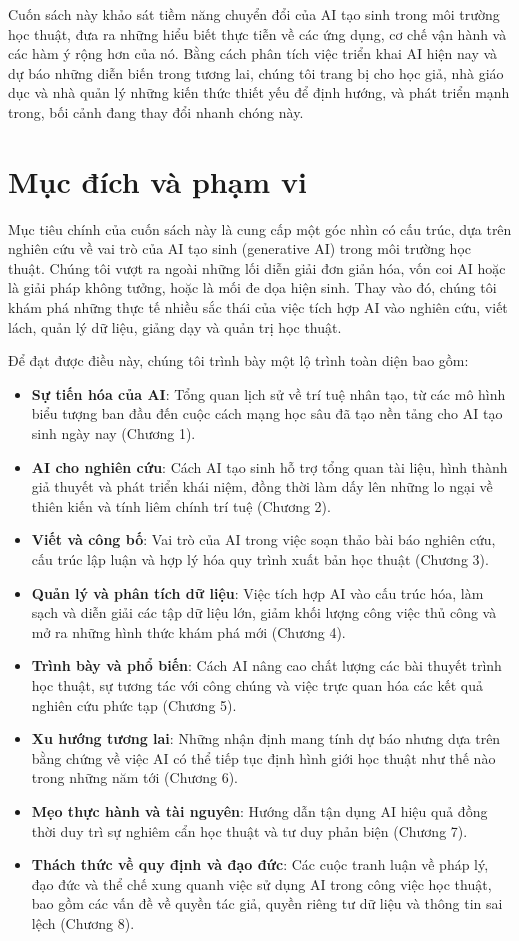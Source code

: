 Cuốn sách này khảo sát tiềm năng chuyển đổi của AI tạo sinh trong môi trường học thuật, đưa ra những hiểu biết thực tiễn về các ứng dụng, cơ chế vận hành và các hàm ý rộng hơn của nó. Bằng cách phân tích việc triển khai AI hiện nay và dự báo những diễn biến trong tương lai, chúng tôi trang bị cho học giả, nhà giáo dục và nhà quản lý những kiến thức thiết yếu để định hướng, và phát triển mạnh trong, bối cảnh đang thay đổi nhanh chóng này.

\section{Mục đích và phạm vi}

Mục tiêu chính của cuốn sách này là cung cấp một góc nhìn có cấu trúc, dựa trên nghiên cứu về vai trò của AI tạo sinh (generative AI) trong môi trường học thuật. Chúng tôi vượt ra ngoài những lối diễn giải đơn giản hóa, vốn coi AI hoặc là giải pháp không tưởng, hoặc là mối đe dọa hiện sinh. Thay vào đó, chúng tôi khám phá những thực tế nhiều sắc thái của việc tích hợp AI vào nghiên cứu, viết lách, quản lý dữ liệu, giảng dạy và quản trị học thuật.

Để đạt được điều này, chúng tôi trình bày một lộ trình toàn diện bao gồm:

\begin{itemize}
\item
  \textbf{Sự tiến hóa của AI}: Tổng quan lịch sử về trí tuệ nhân tạo, từ các mô hình biểu tượng ban đầu đến cuộc cách mạng học sâu đã tạo nền tảng cho AI tạo sinh ngày nay (Chương 1).
\item
  \textbf{AI cho nghiên cứu}: Cách AI tạo sinh hỗ trợ tổng quan tài liệu, hình thành giả thuyết và phát triển khái niệm, đồng thời làm dấy lên những lo ngại về thiên kiến và tính liêm chính trí tuệ (Chương 2).
\item
  \textbf{Viết và công bố}: Vai trò của AI trong việc soạn thảo bài báo nghiên cứu, cấu trúc lập luận và hợp lý hóa quy trình xuất bản học thuật (Chương 3).
\item
  \textbf{Quản lý và phân tích dữ liệu}: Việc tích hợp AI vào cấu trúc hóa, làm sạch và diễn giải các tập dữ liệu lớn, giảm khối lượng công việc thủ công và mở ra những hình thức khám phá mới (Chương 4).
\item
  \textbf{Trình bày và phổ biến}: Cách AI nâng cao chất lượng các bài thuyết trình học thuật, sự tương tác với công chúng và việc trực quan hóa các kết quả nghiên cứu phức tạp (Chương 5).
\item
  \textbf{Xu hướng tương lai}: Những nhận định mang tính dự báo nhưng dựa trên bằng chứng về việc AI có thể tiếp tục định hình giới học thuật như thế nào trong những năm tới (Chương 6).
\item
  \textbf{Mẹo thực hành và tài nguyên}: Hướng dẫn tận dụng AI hiệu quả đồng thời duy trì sự nghiêm cẩn học thuật và tư duy phản biện (Chương 7).
\item
  \textbf{Thách thức về quy định và đạo đức}: Các cuộc tranh luận về pháp lý, đạo đức và thể chế xung quanh việc sử dụng AI trong công việc học thuật, bao gồm các vấn đề về quyền tác giả, quyền riêng tư dữ liệu và thông tin sai lệch (Chương 8).
\end{itemize}

